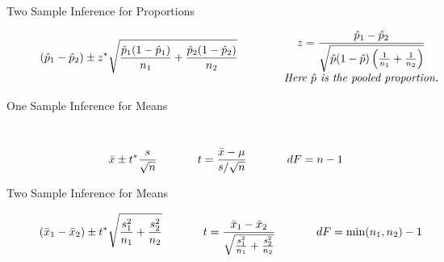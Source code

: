 \documentclass[10pt]{article}
\newcommand{\ds}{\displaystyle}
\begin{document}
\begin{description}
\item[Two Sample Inference for Proportions]
\[
\displaystyle(\hat{p}_1 - \hat{p}_2)  \pm z^* \sqrt{ \frac{\hat{p}_1(1-\hat{p}_1)}{n_1}+\frac{\hat{p}_2(1-\hat{p}_2)}{n_2} } \hspace{0.5in} \begin{array}{c} \displaystyle z = \frac{\hat{p}_1 - \hat{p}_2}{\sqrt{\hat{p}(1-\hat{p})\left( \frac{1}{n_1} + \frac{1}{n_2} \right)}} \\ \textit{Here } \hat{p} \textit{ is the pooled proportion.}\end{array}
\]

\item[One Sample Inference for Means] ~
$$\bar{x} \pm t^* \frac{s}{\sqrt{n}} \hspace*{0.5in} \ds t = \frac{\bar{x} - \mu}{s/\sqrt{n}} \hspace*{0.5in} dF = n-1$$

\item[Two Sample Inference for Means] 
\[
(\bar{x}_1 - \bar{x}_2) \pm t^* \sqrt{ \frac{s_1^2}{n_1} + \frac{s_2^2}{n_2} } \hspace*{0.5in} t = \frac{\bar{x}_1 - \bar{x}_2}{ \sqrt{ \frac{s_1^2}{n_1} + \frac{s_2^2}{n_2}} }  \hspace*{0.5in} dF = \min(n_1,n_2) - 1
\]

\end{description}
\end{document}
